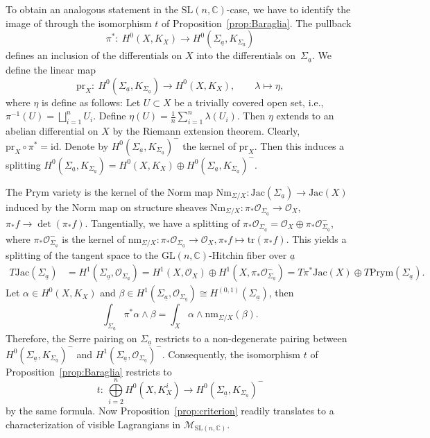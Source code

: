 \documentclass[pdftex]{sigma}
\numberwithin{equation}{section}
\theoremstyle{definition}
\newcommand{\reg}{\mathrm{reg}}
\newcommand{\Jac}{\mathrm{Jac}}
\renewcommand{\to}{\rightarrow}
\newcommand{\calB}{\mathcal{B}}
\newcommand{\calM}{\mathcal{M}}
\newcommand{\calO}{\mathcal{O}}
\newcommand{\CC}{\mathbb{C}}
\newcommand{\id}{\mathrm{id}}
\newcommand{\tr}{\mathrm{tr}}
\newcommand{\Prym}{\mathrm{Prym}}
\newcommand{\Nm}{\mathrm{Nm}}
\newcommand{\GL}{\mathrm{GL}}
\newcommand{\SL}{\mathrm{SL}}
\begin{document}
To obtain an analogous statement in the $\SL(n,\CC)$-case, we have to identify the image of \smash{$T\calB^{\reg}_{\SL(n,\CC)} \subset T\calB^{\reg}_{\GL(n,\CC)}$} through the isomorphism $t$ of Proposition~\ref{prop:Baraglia}. The pullback
\[ \pi^*\colon \ H^0(X,K_X) \rightarrow H^0({\Sigma_{\underline{a}}},K_{\Sigma_{\underline{a}}})
\]
defines an inclusion of the differentials on $X$ into the differentials on~${\Sigma_{\underline{a}}}$. We define the linear map
\[ \mathrm{pr}_X\colon \ H^0({\Sigma_{\underline{a}}},K_{\Sigma_{\underline{a}}}) \to H^0(X,K_X), \qquad \lambda \mapsto \eta,
\]
where $\eta$ is define as follows: Let $U \subset X$ be a trivially covered open set, i.e., $\pi^{-1}(U)=\bigsqcup_{i=1}^n U_i$. Define $\eta(U)= \frac1n \sum_{i=1}^n \lambda(U_i)$. Then $\eta$ extends to an abelian differential on $X$ by the Riemann extension theorem. Clearly, $\mathrm{pr}_X \circ \pi^*=\id$. Denote by $H^0({\Sigma_{\underline{a}}},K_{\Sigma_{\underline{a}}})^-$ the kernel of $\mathrm{pr}_X$. Then this induces a splitting $H^0({\Sigma_{\underline{a}}},K_{\Sigma_{\underline{a}}})=H^0(X,K_X) \oplus H^0({\Sigma_{\underline{a}}}, K_{\Sigma_{\underline{a}}})^-$.


The Prym variety is the kernel of the Norm map $\Nm_{\Sigma/X}\colon \Jac(\Sigma_{\underline{a}}) \to \Jac(X)$ induced by the Norm map on structure sheaves $\Nm_{\Sigma/X}\colon \pi_*\calO_{\Sigma_{\underline{a}}} \to \calO_X$, $\pi_*f \to \det(\pi_*f)$. Tangentially, we have a splitting of $\pi_*\calO_{\Sigma_{\underline{a}}}= \calO_X \oplus \pi_*\calO_{\Sigma_{\underline{a}}}^-$, where $\pi_*\calO_{\Sigma_{\underline{a}}}^-$ is the kernel of $\mathrm{nm}_{\Sigma/X}\colon \pi_* \calO_{\Sigma_{\underline{a}}} \to \calO_X, \pi_*f \mapsto \tr(\pi_*f)$. This yields a splitting of the tangent space to the $\GL(n,\CC)$-Hitchin fiber over $\underline{a}$
\begin{align*} T\Jac({\Sigma_{\underline{a}}})&=H^1({\Sigma_{\underline{a}}},\calO_{\Sigma_{\underline{a}}}) = H^1(X,\calO_X) \oplus H^1(X,\pi_*\calO_{\Sigma_{\underline{a}}}^-)
 = T\pi^*\Jac(X) \oplus T\Prym(\Sigma_{\underline{a}}).
\end{align*}
Let $\alpha \in H^0(X,K_X)$ and $\beta \in H^1({\Sigma_{\underline{a}}},\calO_{\Sigma_{\underline{a}}}) \cong H^{(0,1)}({\Sigma_{\underline{a}}})$, then
\[ \int_{\Sigma_{\underline{a}}} \pi^*\alpha \wedge \beta = \int_X \alpha \wedge \mathrm{nm}_{\Sigma/X} (\beta).
 \] Therefore, the Serre pairing on ${\Sigma_{\underline{a}}}$ restricts to a non-degenerate pairing between $H^0({\Sigma_{\underline{a}}},K_{\Sigma_{\underline{a}}})^-$ and $H^1({\Sigma_{\underline{a}}}, \calO_{{\Sigma_{\underline{a}}}})^-$. Consequently, the isomorphism $t$ of Proposition~\ref{prop:Baraglia} restricts to
\[ t\colon \ \bigoplus\limits_{i=2}^n H^0(X,K_X^i) \to H^0(\Sigma_{\underline{a}},K_{\Sigma_{\underline{a}}})^-
\] by the same formula.
Now Proposition~\ref{prop:criterion} readily translates to a characterization of visible Lagrangians in $\calM_{\SL(n,\CC)}$.
\end{document}
